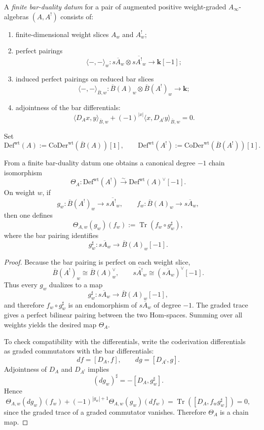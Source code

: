 \begin{definition}
\label{def:finite-bar-duality-datum}
A \emph{finite bar-duality datum} for a pair of augmented positive weight-graded
$A_\infty$-algebras $(A,A^!)$ consists of:
\begin{enumerate}[label=\textup{(\roman*)}]
\item finite-dimensional weight slices $A_w$ and $A^!_w$;
\item perfect pairings
  \[
  \langle -, -\rangle_w\colon s\overline{A}_w\otimes s\overline{A^!}_w\to \mathbf{k}[-1];
  \]
\item induced perfect pairings on reduced bar slices
  \[
  \langle -, -\rangle_{\overline{B},w}\colon \overline{B}(A)_w\otimes \overline{B}(A^!)_w\to \mathbf{k};
  \]
\item adjointness of the bar differentials:
  \[
  \langle D_Ax,y\rangle_{\overline{B},w}
  +(-1)^{|x|}\langle x,D_{A^!}y\rangle_{\overline{B},w}=0.
  \]
\end{enumerate}
Set
\[
\mathrm{Def}^{\mathrm{wt}}(A):=\mathrm{CoDer}^{\mathrm{wt}}(\overline{B}(A))[1],
\qquad
\mathrm{Def}^{\mathrm{wt}}(A^!):=\mathrm{CoDer}^{\mathrm{wt}}(\overline{B}(A^!))[1].
\]
\end{definition}

\begin{theorem}
\label{thm:trace-theoretic-bar-duality}
From a finite bar-duality datum one obtains a canonical degree $-1$ chain
isomorphism
\[
\Theta_A\colon \mathrm{Def}^{\mathrm{wt}}(A^!)
\xrightarrow{\sim}
\mathrm{Def}^{\mathrm{wt}}(A)^\vee[-1].
\]
On weight $w$, if
\[
g_w\colon \overline{B}(A^!)_w\to s\overline{A^!}_w,
\qquad
f_w\colon \overline{B}(A)_w\to s\overline{A}_w,
\]
then one defines
\[
\Theta_{A,w}(g_w)(f_w):=\operatorname{Tr}(f_w\circ g_w^{\sharp}),
\]
where the bar pairing identifies
\[
g_w^{\sharp}\colon s\overline{A}_w\longrightarrow \overline{B}(A)_w[-1].
\]
\end{theorem}

\begin{proof}
Because the bar pairing is perfect on each weight slice,
\[
\overline{B}(A^!)_w\cong \overline{B}(A)_w^\vee,
\qquad
s\overline{A^!}_w\cong (s\overline{A}_w)^\vee[-1].
\]
Thus every $g_w$ dualizes to a map
\[
g_w^{\sharp}\colon s\overline{A}_w\to \overline{B}(A)_w[-1],
\]
and therefore $f_w\circ g_w^{\sharp}$ is an endomorphism of $s\overline{A}_w$ of
degree $-1$.  The graded trace gives a perfect bilinear pairing between the two
Hom-spaces.  Summing over all weights yields the desired map $\Theta_A$.

To check compatibility with the differentials, write the coderivation
differentials as graded commutators with the bar differentials:
\[
df=[D_A,f],
\qquad
dg=[D_{A^!},g].
\]
Adjointness of $D_A$ and $D_{A^!}$ implies
\[
(dg_w)^{\sharp}=-[D_A,g_w^{\sharp}].
\]
Hence
\[
\Theta_{A,w}(dg_w)(f_w)
+(-1)^{|g_w|+1}\Theta_{A,w}(g_w)(df_w)
=\operatorname{Tr}([D_A,f_wg_w^{\sharp}])=0,
\]
since the graded trace of a graded commutator vanishes.  Therefore
$\Theta_A$ is a chain map.
\end{proof}


